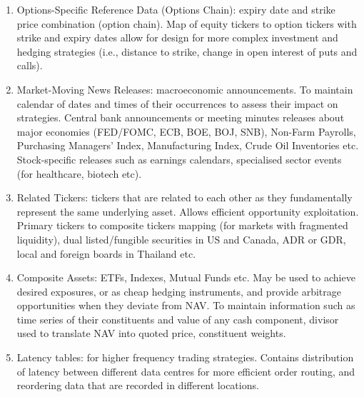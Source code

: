 \begin{definition}
\begin{enumerate}[label=\roman*.]
\item Options-Specific Reference Data (Options Chain): expiry date and strike price combination (option chain). Map of equity tickers to option tickers with strike and expiry dates allow for design for more complex investment and hedging strategies (i.e., distance to strike, change in open interest of puts and calls).
\item Market-Moving News Releases: macroeconomic announcements. To maintain calendar of dates and times of their occurrences to assess their impact on strategies. Central bank announcements or meeting minutes releases about major economies (FED/FOMC, ECB, BOE, BOJ, SNB), Non-Farm Payrolls, Purchasing Managers' Index, Manufacturing Index, Crude Oil Inventories etc.\\
Stock-specific releases such as earnings calendars, specialised sector events (for healthcare, biotech etc).
\item Related Tickers: tickers that are related to each other as they fundamentally represent the same underlying asset. Allows efficient opportunity exploitation. Primary tickers to composite tickers mapping (for markets with fragmented liquidity), dual listed/fungible securities in US and Canada, ADR or GDR, local and foreign boards in Thailand etc.
\item Composite Assets: ETFs, Indexes, Mutual Funds etc. May be used to achieve desired exposures, or as cheap hedging instruments, and provide arbitrage opportunities when they deviate from NAV. To maintain information such as time series of their constituents and value of any cash component, divisor used to translate NAV into quoted price, constituent weights.
\item Latency tables: for higher frequency trading strategies. Contains distribution of latency between different data centres for more efficient order routing, and reordering data that are recorded in different locations.
\end{enumerate}
\end{definition}

